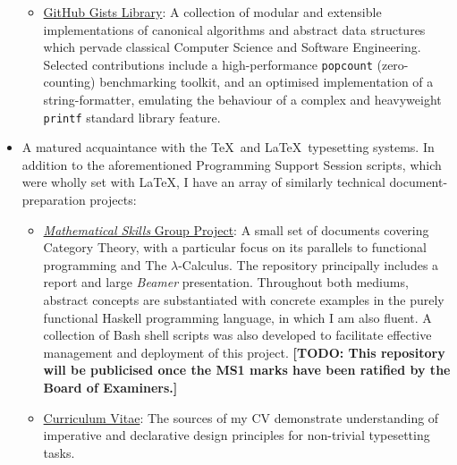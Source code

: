 \documentclass{article}
\newcommand{\todomark}[1]{{\color{red}\textbf{[TODO: #1]}}}
\newcommand{\githublink}[2]{\href{https://github.com/oliverdixon/#1}{#2}}
\newcommand{\gistlink}[2]{\href{https://gist.github.com/oliverdixon/#1}{#2}}
\begin{document}
\begin{itemize}
\begin{itemize}
                \item \gistlink{}{GitHub Gists Library}: A collection of modular
                and extensible implementations of canonical algorithms and
                abstract data structures which pervade classical Computer
                Science and Software Engineering. Selected contributions
                include a high-performance \texttt{popcount} (zero-counting)
                benchmarking toolkit, and an optimised implementation of a
                string-formatter, emulating the behaviour of a complex and
                heavyweight \texttt{printf} standard library feature.
        \end{itemize}
        \item A matured acquaintance with the \TeX\ and \LaTeX\ typesetting
        systems. In addition to the aforementioned Programming Support Session
        scripts, which were wholly set with \LaTeX, I have an array of similarly
        technical document-preparation projects:
        \begin{itemize}
                \item \githublink{MS1GP}{\textit{Mathematical Skills} Group
                Project}: A small set of documents covering Category Theory,
                with a particular focus on its parallels to functional
                programming and The $\lambda$-Calculus. The repository
                principally includes a report and large \textit{Beamer}
                presentation. Throughout both mediums, abstract concepts are
                substantiated with concrete examples in the purely functional
                Haskell programming language, in which I am also fluent. A
                collection of Bash shell scripts was also developed to
                facilitate effective management and deployment of this project.
                \todomark{This repository will be publicised once the MS1 marks
                have been ratified by the Board of Examiners.}

                \item \githublink{cv}{Curriculum Vitae}: The sources of my CV
                demonstrate understanding of imperative and declarative design
                principles for non-trivial typesetting tasks.


\end{itemize}
\end{itemize}
\end{document}
